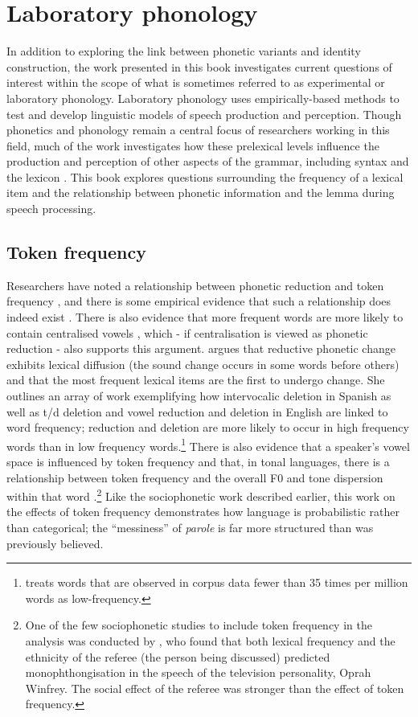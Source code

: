 \section{Laboratory phonology}
In addition to exploring the link between phonetic variants and identity construction, the work presented in this book investigates current questions of interest within the scope of what is sometimes referred to as experimental or laboratory phonology.  Laboratory phonology uses empirically-based methods to test and develop linguistic models of speech production and perception.  Though phonetics and phonology remain a central focus of researchers working in this field, much of the work investigates how these prelexical levels influence the production and perception of other aspects of the grammar, including syntax \cite{haybresnan2006} and the lexicon \cite{bybee2002-lvc,gahl-thyme}.  This book explores questions surrounding the frequency of a lexical item and the relationship between phonetic information and the lemma during speech processing.
 
	
	\subsection{Token frequency}\label{sec:frequency}
Researchers have noted a relationship between phonetic reduction and token frequency \cite{bybee2001,zipf1929}, and there is some empirical evidence that such a relationship does indeed exist \cite{aylettturk2004,bakerbradlow2009,belletal2009}. There is also evidence that more frequent words are more likely to contain centralised vowels \cite{aylettturk2006,munsonsolomon2004}, which - if centralisation is viewed as phonetic reduction - also supports this argument.   argues that reductive phonetic change exhibits lexical diffusion (the sound change occurs in some words before others) and that the most frequent lexical items are the first to undergo change.  She outlines an array of work exemplifying how intervocalic  deletion in Spanish as well as t/d deletion and vowel reduction and deletion in English are linked to word frequency; reduction and deletion are more likely to occur in high frequency words than in low frequency words.\footnote{ treats words that are observed in corpus data fewer than 35 times per million words as low-frequency.} There is also evidence that a speaker's vowel space is influenced by token frequency \cite{munson2007} and that, in tonal languages, there is a relationship between token frequency and the overall F0 and tone dispersion within that word \cite{zhaojurafsky2007}.\footnote{One of the few sociophonetic studies to include token frequency in the analysis was conducted by , who found that both lexical frequency and the ethnicity of the referee (the person being discussed) predicted  monophthongisation in the speech of the television personality, Oprah Winfrey.  The social effect of the referee was stronger than the effect of token frequency.}  Like the sociophonetic work described earlier, this work on the effects of token frequency demonstrates how language is probabilistic rather than categorical; the ``messiness'' of \textit{parole} is far more structured than was previously believed.

